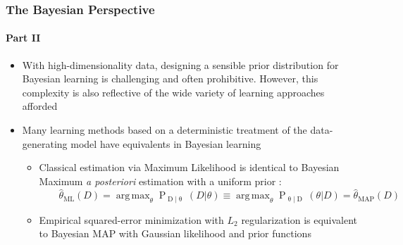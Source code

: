 \documentclass[aspectratio=169,usenames,dvipsnames]{beamer}
\DeclareMathOperator*{\argmin}{arg\,min}
\DeclareMathOperator*{\argmax}{arg\,max}
\DeclareMathOperator{\Drm}{\mathrm{D}}
\DeclareMathOperator{\Trm}{\mathrm{T}}
\DeclareMathOperator{\Prm}{\mathrm{P}}
\DeclareMathOperator{\Ncal}{\mathcal{N}}
\begin{document}
\begin{frame}
\frametitle{The Bayesian Perspective}
\framesubtitle{Part II}

\begin{itemize}
\item With high-dimensionality data, designing a sensible prior distribution for Bayesian learning is challenging and often prohibitive. However, this complexity is also reflective of the wide variety of learning approaches afforded
\vspace{0.5em}
\item Many learning methods based on a deterministic treatment of the data-generating model have \alert{equivalents} in Bayesian learning
\vspace{0.25em}
	\begin{itemize}
	\item Classical estimation via Maximum Likelihood is identical to Bayesian Maximum \emph{a posteriori} estimation with a uniform prior \cite{kay-est}: \\
	\vspace{0.25em}
	$\qquad \hat{\theta}_{\mathrm{ML}}(D) = \argmax_{\theta} \Prm_{\Drm | \uptheta}(D | \theta) \equiv \argmax_{\theta} \Prm_{\uptheta | \Drm}(\theta | D) = \hat{\theta}_{\mathrm{MAP}}(D)$
	\vspace{0.25em}
	\item Empirical squared-error minimization with $L_2$ regularization is equivalent to Bayesian MAP with Gaussian likelihood and prior functions \cite{theodoridis-ML}
	\end{itemize}

\end{itemize}


\vspace{0.5em}
\centering
{}

\end{frame}
\end{document}
